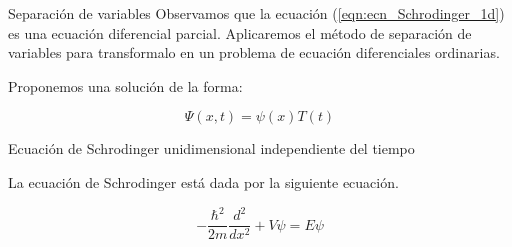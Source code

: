 \begin{frame}{Separación de variables}
    Observamos que la ecuación (\ref{eqn:ecn_Schrodinger_1d}) es una ecuación diferencial parcial. Aplicaremos el método de separación de variables para transformalo en un problema de ecuación diferenciales ordinarias. 
    
    \vspace{0.2cm}
    
    Proponemos una solución de la forma:

    \begin{equation}
        \Psi(x, t) = \psi(x) T(t)
    \end{equation}

\end{frame}


\begin{frame}{Ecuación de Schrodinger unidimensional independiente del tiempo}

    La ecuación de Schrodinger está dada por la siguiente ecuación.

    \begin{equation}
        -\frac{\hbar^2}{2m} \frac{d^2}{dx^2} + V \psi = E \psi
    \end{equation}

\end{frame}